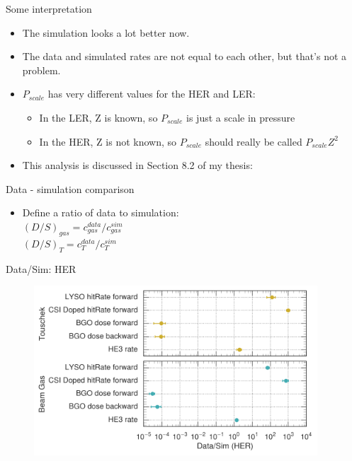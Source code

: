 \documentclass[xcolor=dvipsnames]{beamer}
\begin{document}
\begin{frame}{Some interpretation}
\begin{itemize}
	\item
	The simulation looks a lot better now.
	\item
	The data and simulated rates are not equal to each other, but that's not a problem.
	\item
	$P_{scale}$ has very different values for the HER and LER:
	\begin{itemize}
		\item
		In the LER, Z is known, so $P_{scale}$ is just a scale in pressure
		\item
		In the HER, Z is not known, so $P_{scale}$ should really be called $P_{scale}Z^2$
	\end{itemize}	
	\item
	This analysis is discussed in Section 8.2 of my thesis: \href{https://www.dropbox.com/s/jji6kuvv6u854s7/mainthesisUVIC.pdf?dl=0}{\color{blue}{Dropbox link}}

\end{itemize}
\end{frame}

\begin{frame}{Data - simulation comparison}
\begin{itemize}
	\item
	Define a ratio of data to simulation:
	\\ \Large
	$(D/S)_{gas} = c_{gas}^{data}/c_{gas}^{sim}$\\ \vspace{0.25cm}
	$(D/S)_{T} = c_{T}^{data}/c_{T}^{sim}$\\

\end{itemize}
\end{frame}

\begin{frame}{Data/Sim: HER}
\begin{figure}	
	\includegraphics[height=2.5in]{../figs/Results/HERRatioPlot}
\end{figure}
\end{frame}
\end{document}
